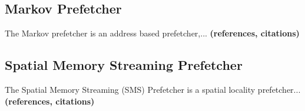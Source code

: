 \subsection{Markov Prefetcher}
\label{sec:markovPrefetcher}
The Markov prefetcher is an address based prefetcher,...
{\bf (references, citations)}

\subsection{Spatial Memory Streaming Prefetcher}
\label{sec:smsPrefetcher}
The Spatial Memory Streaming (SMS) Prefetcher is a spatial locality
prefetcher...  {\bf (references, citations)}
